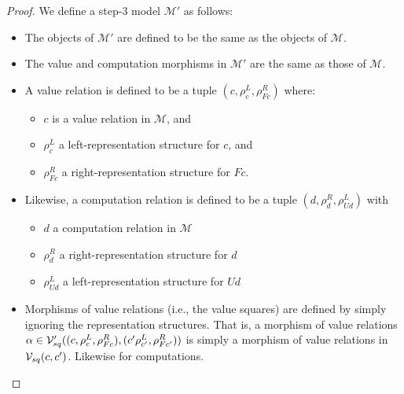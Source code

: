 \begin{proof}
  We define a step-3 model $\mathcal M'$ as follows:
  \begin{itemize}
    \item The objects of $\mathcal M'$ are defined to be the same as the objects of $\mathcal M$.
    \item The value and computation morphisms in $\mathcal M'$ are the same as those of $\mathcal M$.
    \item A value relation is defined to be a tuple $(c, \rho^L_c, \rho^R_{Fc})$ where:
    \begin{itemize}
      \item $c$ is a value relation in $\mathcal M$, and 
      \item $\rho^L_c$ a left-representation structure for $c$, and 
      \item $\rho^R_{Fc}$ a right-representation structure for $Fc$.
    \end{itemize}
    \item Likewise, a computation relation is defined to be a tuple $(d, \rho^R_d, \rho^L_{Ud})$ with
    \begin{itemize}
      \item $d$ a computation relation in $\mathcal M$
      \item $\rho^R_d$ a right-representation structure for $d$
      \item $\rho^L_{Ud}$ a left-representation structure for $Ud$
    \end{itemize}
    \item Morphisms of value relations (i.e., the value squares) are defined by simply
    ignoring the representation structures. That is, a morphism of value relations
    $\alpha \in \mathcal{V}_{sq}'((c, \rho^L_c, \rho^R_{Fc}), (c' \rho^L_{c'}, \rho^R_{Fc'}))$ is simply a morphism of value
    relations in $\mathcal{V}_{sq}(c, c')$. Likewise for computations.
  \end{itemize}
\end{proof}








